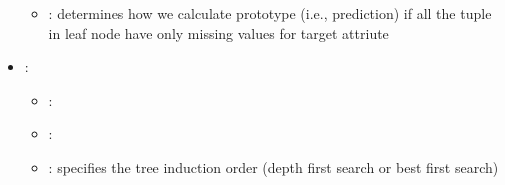 \begin{itemize}
\begin{itemize}
                \item \optionDescrption{}: determines how we calculate prototype (i.e., prediction) if all the tuple in leaf node have only missing values for target attriute 
           \end{itemize}
    \item {}:
           \begin{itemize}
                \item \optionPossibleValues{}: 
                \item \optionDefaultValue{}: 
                \item \optionDescrption{}: specifies the tree induction order (depth first search or best first search)
           \end{itemize}
\end{itemize}
